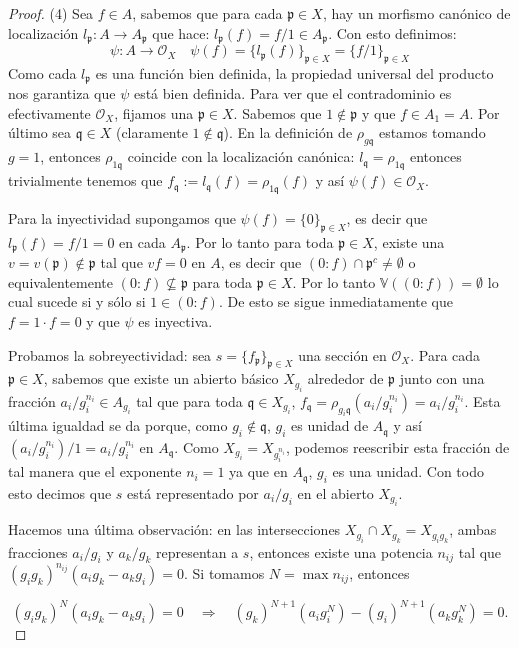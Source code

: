 \documentclass[10pt]{report}
\theoremstyle{plain}\newtheorem{thm}{Teorema}
\theoremstyle{plain}\newtheorem{lem}[thm]{Lema}
\theoremstyle{plain}\newtheorem*{conjecture*}{Conjetura}
\theoremstyle{plain}\newtheorem{cor}[thm]{Corolario}
\theoremstyle{definition}\newtheorem{defin}{Definici\'on}
\theoremstyle{definition}\newtheorem*{defin*}{Definici\'on}
\theoremstyle{remark}\newtheorem{claim}{Proposici\'on}
\theoremstyle{remark}\newtheorem*{claim*}{Proposici\'on}
\theoremstyle{remark}\newtheorem*{eje*}{$\mathbf{Ejercicio}$}
\theoremstyle{remark}\newtheorem{exa}{Ejemplo}
\newcommand{\p}{\mathfrak{p}} %
\newcommand{\q}{\mathfrak{q}} %
\newcommand{\OO}{\mathcal{O}} %
\newcommand{\V}[1]{\mathbb{V}(#1)}
\newcommand{\then}{\Longrightarrow}
\newcommand{\ra}{\rightarrow}
\begin{document}
\begin{proof}
(4) Sea $f\in A$, sabemos que para cada $\p\in X$, hay un morfismo can\'onico de localizaci\'on $l_{\p}:A\ra A_{\p}$ que hace:
$l_{\p}(f)=f/1\in A_{\p}$. Con esto definimos:
\[
	\psi:A\ra \OO_X\quad \psi(f)=\{l_{\p}(f)\}_{\p\in X}=\{f/1\}_{\p\in X}
\]
Como cada $l_{\p}$ es una funci\'on bien definida, la propiedad universal del producto nos garantiza que $\psi$ est\'a bien
definida. Para ver que el contradominio es efectivamente $\OO_X$, fijamos una $\p\in X$. Sabemos que $1\not\in\p$ y que
$f\in A_1=A$. Por \'ultimo sea $\q\in X$ (claramente $1\not\in\q$). En la definici\'on de $\rho_{g\q}$ estamos tomando $g=1$,
entonces $\rho_{1\q}$ coincide con la localizaci\'on can\'onica: $l_{\q}=\rho_{1\q}$ entonces trivialmente tenemos que
$f_{\q}:=l_{\q}(f)=\rho_{1\q}(f)$ y as\'i $\psi(f)\in\OO_X$.

Para la inyectividad supongamos que $\psi(f)=\{0\}_{\p\in X}$, es decir que $l_{\p}(f)=f/1=0$ en cada $A_{\p}$. Por lo
tanto para toda $\p\in X$, existe una $v=v(\p)\not\in\p$ tal que $vf=0$ en $A$, es decir que $(0:f)\cap \p^c\neq\emptyset$
o equivalentemente $(0:f)\not\subseteq\p$ para toda $\p\in X$. Por lo tanto $\V{(0:f)}=\emptyset$ lo cual sucede si y s\'olo
si $1\in(0:f)$. De esto se sigue inmediatamente que $f=1\cdot f=0$ y que $\psi$ es inyectiva.

Probamos la sobreyectividad: sea $s=\{f_{\p}\}_{\p\in X}$ una secci\'on en $\OO_X$. Para cada $\p\in X$, sabemos que existe
un abierto b\'asico $X_{g_i}$ alrededor de $\p$ junto con una fracci\'on $a_i/g_i^{n_i}\in A_{g_i}$ tal que para toda
$\q\in X_{g_i}$, $f_{\q}=\rho_{g_i\q}(a_i/g_i^{n_i})=a_i/g_i^{n_i}$. Esta \'ultima igualdad se da porque, como $g_i\not\in\q$,
$g_i$ es unidad de $A_{\q}$ y as\'i $(a_i/g_i^{n_i})/1=a_i/g_i^{n_i}$ en $A_{\q}$. Como $X_{g_i}=X_{g_i^{n_i}}$, podemos
reescribir esta fracci\'on de tal manera que el exponente $n_i=1$ ya que en $A_{\q}$, $g_i$ es una unidad. Con todo esto
decimos que $s$ est\'a representado por $a_i/g_i$ en el abierto $X_{g_i}$.

Hacemos una \'ultima observaci\'on: en las intersecciones $X_{g_i}\cap X_{g_k}=X_{g_i g_k}$, ambas fracciones $a_i/g_i$ y
$a_k/g_k$ representan a $s$, entonces existe una potencia $n_{ij}$ tal que $(g_i g_k)^{n_{ij}}(a_i g_k-a_k g_i)=0$. Si
tomamos $N=\max{n_{ij}}$, entonces

\begin{equation}\label{uno}
	(g_i g_k)^N (a_i g_k-a_k g_i)=0 \quad\then\quad (g_k)^{N+1} (a_i g_i^N)-(g_i)^{N+1}(a_k g_k^N)=0.
\end{equation}


\end{proof}
\end{document}

